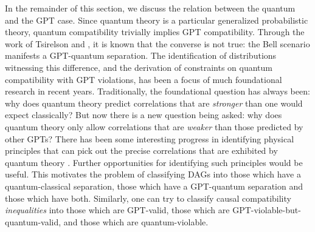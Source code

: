 \documentclass[aps,english,superscriptaddress,onecolumn,twoside,longbibliography,pra,floatfix,fleqn,nofootinbib]{revtex4-1}%
\theoremstyle{definition}
\newcommand{\An}[2][]{{\mathsf{An}_{#1}}\parenths{#2}}
\DeclarePairedDelimiter{\parenths}{\lparen}{\rparen}
\begin{document}

In the remainder of this section, we discuss the relation between the quantum and the GPT case. Since quantum theory is a particular generalized probabilistic theory, quantum compatibility trivially implies GPT compatibility. Through the work of Tsirelson \cite{Tsirelson1980} and \citet{PROriginal}, it is known that the converse is not true: the Bell scenario manifests a GPT-quantum separation.  The identification of distributions witnessing this difference, and the derivation of constraints on quantum compatibility with GPT violations, has been a focus of much foundational research in recent years. Traditionally, the foundational question has always been: why does quantum theory predict correlations that are {\em stronger} than one would expect classically?  But now there is a new question being asked: why does quantum theory only allow correlations that are {\em weaker} than those predicted by other GPTs?  There has been some interesting progress in identifying physical principles that can pick out the precise correlations that are exhibited by quantum theory \cite{PopescuReviewNatureComm,ScaraniML,Rohrlich2014,InfoCausArXiv,LONatureComm,LOExploring,EPNBody,barnum2014interference,AlmostQuantum}.  Further opportunities for identifying such principles would be useful.  This motivates the problem of classifying DAGs into those which have a quantum-classical separation, those which have a GPT-quantum separation and those which have both. Similarly, one can try to classify causal compatibility \emph{inequalities} into those which are GPT-valid, those which are GPT-violable-but-quantum-valid, and those which are quantum-violable. 
\end{document}

